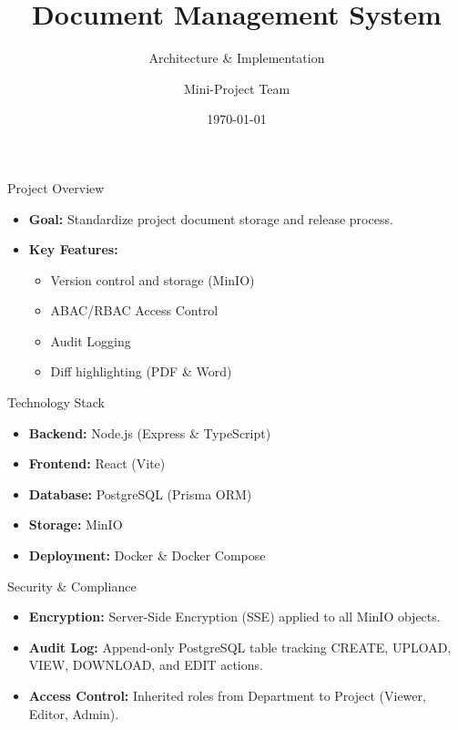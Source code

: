 \documentclass{beamer}
\title{Document Management System}
\subtitle{Architecture \& Implementation}
\author{Mini-Project Team}
\date{\today}
\begin{document}
\begin{frame}
\titlepage
\end{frame}

\begin{frame}{Project Overview}
\begin{itemize}
    \item \textbf{Goal:} Standardize project document storage and release process.
    \item \textbf{Key Features:}
    \begin{itemize}
        \item Version control and storage (MinIO)
        \item ABAC/RBAC Access Control
        \item Audit Logging
        \item Diff highlighting (PDF \& Word)
    \end{itemize}
\end{itemize}
\end{frame}

\begin{frame}{Technology Stack}
\begin{itemize}
    \item \textbf{Backend:} Node.js (Express \& TypeScript)
    \item \textbf{Frontend:} React (Vite)
    \item \textbf{Database:} PostgreSQL (Prisma ORM)
    \item \textbf{Storage:} MinIO
    \item \textbf{Deployment:} Docker \& Docker Compose
\end{itemize}
\end{frame}

\begin{frame}{Security \& Compliance}
\begin{itemize}
    \item \textbf{Encryption:} Server-Side Encryption (SSE) applied to all MinIO objects.
    \item \textbf{Audit Log:} Append-only PostgreSQL table tracking CREATE, UPLOAD, VIEW, DOWNLOAD, and EDIT actions.
    \item \textbf{Access Control:} Inherited roles from Department to Project (Viewer, Editor, Admin).
\end{itemize}
\end{frame}
\end{document}
